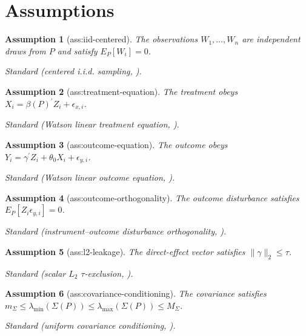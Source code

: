\documentclass{article}
\newtheorem{assumption}{Assumption}
\begin{document}
\section{Assumptions}

\begin{assumption}[ass:iid-centered]\label{ass:iid-centered}
The observations \(W_1,\ldots,W_n\) are independent draws from \(P\) and satisfy \(E_P[W_i]=0\).
\par\smallskip\noindent\emph{Standard} (centered i.i.d. sampling, \cite{watson2024bounding}).
\end{assumption}

\begin{assumption}[ass:treatment-equation]\label{ass:treatment-equation}
The treatment obeys \(X_i=\beta(P)^{\prime}Z_i+\epsilon_{x,i}\).
\par\smallskip\noindent\emph{Standard} (Watson linear treatment equation, \cite{watson2024bounding}).
\end{assumption}

\begin{assumption}[ass:outcome-equation]\label{ass:outcome-equation}
The outcome obeys \(Y_i=\gamma^{\prime}Z_i+\theta_0X_i+\epsilon_{y,i}\).
\par\smallskip\noindent\emph{Standard} (Watson linear outcome equation, \cite{watson2024bounding}).
\end{assumption}

\begin{assumption}[ass:outcome-orthogonality]\label{ass:outcome-orthogonality}
The outcome disturbance satisfies \(E_P[Z_i\epsilon_{y,i}]=0\).
\par\smallskip\noindent\emph{Standard} (instrument--outcome disturbance orthogonality, \cite{watson2024bounding}).
\end{assumption}

\begin{assumption}[ass:l2-leakage]\label{ass:l2-leakage}
The direct-effect vector satisfies \(\|\gamma\|_2\leq\tau\).
\par\smallskip\noindent\emph{Standard} (scalar \(L_2\) \(\tau\)-exclusion, \cite{watson2024bounding}).
\end{assumption}

\begin{assumption}[ass:covariance-conditioning]\label{ass:covariance-conditioning}
The covariance satisfies \(m_{\Sigma}\leq\lambda_{\min}(\Sigma(P))\leq\lambda_{\max}(\Sigma(P))\leq M_{\Sigma}\).
\par\smallskip\noindent\emph{Standard} (uniform covariance conditioning, \cite{chernozhukovNeweySantos2023constrained}).
\end{assumption}
\end{document}
